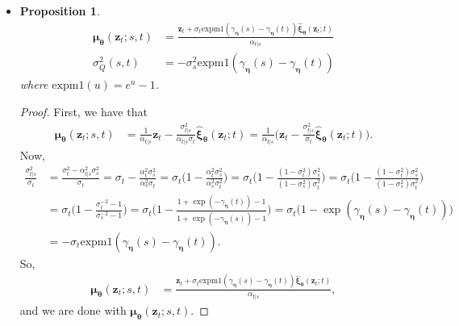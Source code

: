 \documentclass[10pt]{article}
\newtheorem{proposition}[lemma]{Proposition}
\newcommand{\ve}[1]{\mathbf{#1}}
\newcommand{\ves}[1]{\boldsymbol{#1}}
\newcommand{\mrm}[1]{\mathrm{#1}}
\begin{document}
\begin{itemize}
\item \begin{proposition} \label{thm:backward-process-simplification}
\begin{align*}
  \ves{\mu}_{\ves{\theta}}(\ve{z}_t; s, t) 
  &= \frac{\ve{z}_t + \sigma_t \mrm{expm1}( \gamma_{\ves{\eta}}(s) - \gamma_{\ves{\eta}}(t)) \hat{\ves{\xi}}_{\ves{\theta}}(\ve{z}_t; t)}{\alpha_{t|s}} \\
  \sigma_Q^2(s,t) &= -\sigma_s^2 \mrm{expm1}(\gamma_{\ves{\eta}}(s) - \gamma_{\ves{\eta}}(t))
\end{align*}
where $\mrm{expm1}(u) = e^u - 1$.
\end{proposition}

\begin{proof}
First, we have that
\begin{align*}
  \ves{\mu}_{\ves{\theta}}(\ve{z}_t; s, t)
  &= \frac{1}{\alpha_{t|s}} \ve{z}_t - \frac{\sigma_{t|s}^2}{\alpha_{t|s}\sigma_t} \hat{\ves{\xi}}_{\ves{\theta}}(\ve{z}_t; t)
  = \frac{1}{\alpha_{t|s}} \bigg( \ve{z}_t - \frac{\sigma_{t|s}^2}{\sigma_t} \hat{\ves{\xi}}_{\ves{\theta}}(\ve{z}_t; t) \bigg).
\end{align*}
Now,
\begin{align*}
  \frac{\sigma_{t|s}^2}{\sigma_t} 
  &= \frac{\sigma_t^2 - \alpha^2_{t|s}\sigma^2_s}{\sigma_t}
  = \sigma_t - \frac{\alpha_t^2 \sigma_s^2}{\alpha_s^2 \sigma_t}
  = \sigma_t \bigg( 1 - \frac{\alpha_t^2 \sigma_s^2}{\alpha_s^2 \sigma_t^2 } \bigg)  
  = \sigma_t \bigg( 1 - \frac{(1 - \sigma_t^2) \sigma_s^2}{(1 - \sigma_s^2) \sigma_t^2 } \bigg)
  = \sigma_t \bigg( 1 - \frac{(1 - \sigma_t^2) \sigma_s^2}{(1 - \sigma_s^2) \sigma_t^2 } \bigg) \\
  &= \sigma_t \bigg( 1 - \frac{\sigma_t^{-2} - 1}{\sigma_s^{-2} -1} \bigg)
  = \sigma_t \bigg( 1 - \frac{1 + \exp(-\gamma_{\ves{\eta}}(t)) - 1}{1 + \exp(-\gamma_{\ves{\eta}}(s)) -1} \bigg)
  = \sigma_t \big( 1 - \exp(\gamma_{\ves{\eta}}(s) - \gamma_{\ves{\eta}}(t)) \big) \\
  &= -\sigma_t \mrm{expm1}(\gamma_{\ves{\eta}}(s) - \gamma_{\ves{\eta}}(t)).
\end{align*}
So,
\begin{align*}
  \ves{\mu}_{\ves{\theta}}(\ve{z}_t; s, t)
  &= \frac{\ve{z}_t + \sigma_t \mrm{expm1}( \gamma_{\ves{\eta}}(s) - \gamma_{\ves{\eta}}(t)) \hat{\ves{\xi}}_{\ves{\theta}}(\ve{z}_t; t)}{\alpha_{t|s}},
\end{align*}
and we are done with $\ves{\mu}_{\ves{\theta}}(\ve{z}_t; s, t)$.


\end{proof}
\end{itemize}
\end{document}
